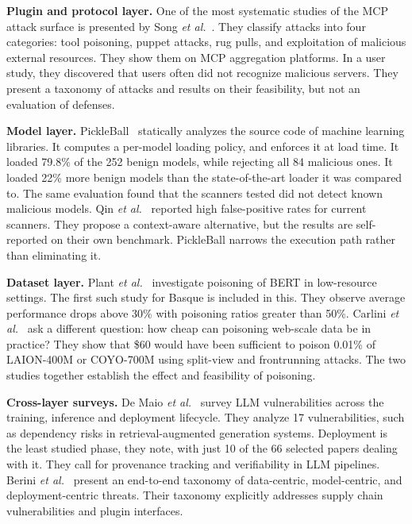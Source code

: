 \documentclass[conference]{IEEEtran}
\begin{document}
\textbf{Plugin and protocol layer.} One of the most systematic studies of the MCP attack surface is presented by Song \textit{et al.}~\cite{song2025}. They classify attacks into four categories: tool poisoning, puppet attacks, rug pulls, and exploitation of malicious external resources. They show them on MCP aggregation platforms. In a user study, they discovered that users often did not recognize malicious servers. They present a taxonomy of attacks and results on their feasibility, but not an evaluation of defenses.

\textbf{Model layer.} PickleBall~\cite{pickleball2025} statically analyzes the source code of machine learning libraries. It computes a per-model loading policy, and enforces it at load time. It loaded 79.8\% of the 252 benign models, while rejecting all 84 malicious ones. It loaded 22\% more benign models than the state-of-the-art loader it was compared to. The same evaluation found that the scanners tested did not detect known malicious models. Qin \textit{et al.}~\cite{qin2026} reported high false-positive rates for current scanners. They propose a context-aware alternative, but the results are self-reported on their own benchmark. PickleBall narrows the execution path rather than eliminating it.

\textbf{Dataset layer.} Plant \textit{et al.}~\cite{plant2025} investigate poisoning of BERT in low-resource settings. The first such study for Basque is included in this. They observe average performance drops above 30\% with poisoning ratios greater than 50\%. Carlini \textit{et al.}~\cite{carlini2024} ask a different question: how cheap can poisoning web-scale data be in practice? They show that \$60 would have been sufficient to poison 0.01\% of LAION-400M or COYO-700M using split-view and frontrunning attacks. The two studies together establish the effect and feasibility of poisoning.

\textbf{Cross-layer surveys.} De Maio \textit{et al.}~\cite{demaio2025} survey LLM vulnerabilities across the training, inference and deployment lifecycle. They analyze 17 vulnerabilities, such as dependency risks in retrieval-augmented generation systems. Deployment is the least studied phase, they note, with just 10 of the 66 selected papers dealing with it. They call for provenance tracking and verifiability in LLM pipelines. Berini \textit{et al.}~\cite{berini2026} present an end-to-end taxonomy of data-centric, model-centric, and deployment-centric threats. Their taxonomy explicitly addresses supply chain vulnerabilities and plugin interfaces.
\end{document}
